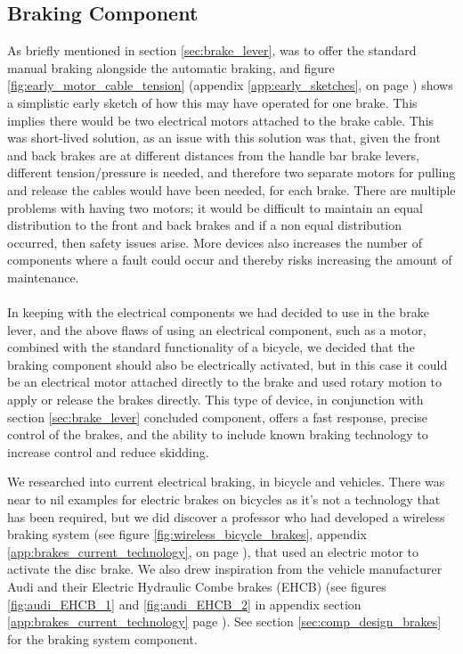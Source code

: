 \documentclass[a4paper]{report}
\begin{document}

\subsection{Braking Component}
\label{sec:braking_component}

As briefly mentioned in section \ref{sec:brake_lever}, was to offer the standard manual braking alongside the automatic braking, and figure \ref{fig:early_motor_cable_tension} (appendix \ref{app:early_sketches}, on page \pageref{fig:early_motor_cable_tension}) shows a simplistic early sketch of how this may have operated for one brake. This implies there would be two electrical motors attached to the brake cable. This was short-lived solution, as an issue with this solution was that, given the front and back brakes are at different distances from the handle bar brake levers, different tension/pressure is needed, and therefore two separate motors for pulling and release the cables would have been needed, for each brake. There are multiple problems with having two motors; it would be difficult to maintain an equal distribution to the front and back brakes and if a non equal distribution occurred, then safety issues arise. More devices also increases the number of components where a fault could occur and thereby risks increasing the amount of maintenance.  

\paragraph{}In keeping with the electrical components we had decided to use in the brake lever, and the above flaws of using an electrical component, such as a motor, combined with the standard functionality of a bicycle, we decided that the braking component should also be electrically activated, but in this case it could be an electrical motor attached directly to the brake and used rotary motion to apply or release the brakes directly. This type of device, in conjunction with section \ref{sec:brake_lever} concluded component, offers a fast response, precise control of the brakes, and the ability to include known braking technology to increase control and reduce skidding.

We researched into current electrical braking, in bicycle and vehicles. There was near to nil examples for electric brakes on bicycles as it's not a technology that has been required, but we did discover a professor \cite{wireless_bicycle_brakes} who had developed a wireless braking system (see figure \ref{fig:wireless_bicycle_brakes}, appendix \ref{app:brakes_current_technology}, on page \pageref{fig:wireless_bicycle_brakes}), that used an electric motor to activate the disc brake. We also drew inspiration from the vehicle manufacturer Audi and their Electric Hydraulic Combe brakes (EHCB) (see figures \ref{fig:audi_EHCB_1} and \ref{fig:audi_EHCB_2} in appendix section \ref{app:brakes_current_technology} page \pageref{app:brakes_current_technology}). See section \ref{sec:comp_design_brakes} for the braking system component.
\end{document}

